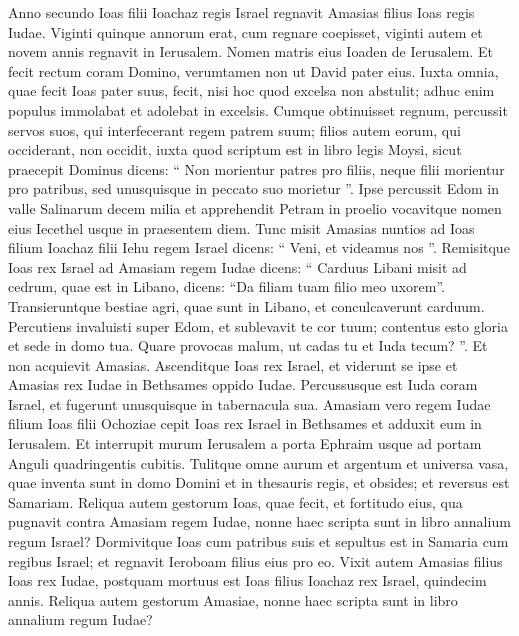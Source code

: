 \begin{biblechapter}
\begin{biblechapter}
\begin{biblechapter}
\begin{biblechapter}
\begin{biblechapter}
\begin{biblechapter}
\begin{biblechapter}
\begin{biblechapter}
\begin{biblechapter}
\begin{biblechapter}
\begin{biblechapter}
\begin{biblechapter}
\begin{biblechapter}
\begin{biblechapter}
 \verse Anno secundo Ioas filii Ioachaz regis Israel regnavit Amasias filius Ioas regis Iudae. 
\verse Viginti quinque annorum erat, cum regnare coepisset, viginti autem et novem annis regnavit in Ierusalem. Nomen matris eius Ioaden de Ierusalem. 
\verse Et fecit rectum coram Domino, verumtamen non ut David pater eius. Iuxta omnia, quae fecit Ioas pater suus, fecit, 
\verse nisi hoc quod excelsa non abstulit; adhuc enim populus immolabat et adolebat in excelsis. 
 \verse Cumque obtinuisset regnum, percussit servos suos, qui interfecerant regem patrem suum; 
\verse filios autem eorum, qui occiderant, non occidit, iuxta quod scriptum est in libro legis Moysi, sicut praecepit Dominus dicens: “ Non morientur patres pro filiis, neque filii morientur pro patribus, sed unusquisque in peccato suo morietur ”.
 \verse Ipse percussit Edom in valle Salinarum decem milia et apprehendit Petram in proelio vocavitque nomen eius Iecethel usque in praesentem diem.
 \verse Tunc misit Amasias nuntios ad Ioas filium Ioachaz filii Iehu regem Israel dicens: “ Veni, et videamus nos ”. 
\verse Remisitque Ioas rex Israel ad Amasiam regem Iudae dicens: “ Carduus Libani misit ad cedrum, quae est in Libano, dicens: “Da filiam tuam filio meo uxorem”. Transieruntque bestiae agri, quae sunt in Libano, et conculcaverunt carduum. 
\verse Percutiens invaluisti super Edom, et sublevavit te cor tuum; contentus esto gloria et sede in domo tua. Quare provocas malum, ut cadas tu et Iuda tecum? ”. 
\verse Et non acquievit Amasias.
 Ascenditque Ioas rex Israel, et viderunt se ipse et Amasias rex Iudae in Bethsames oppido Iudae. 
\verse Percussusque est Iuda coram Israel, et fugerunt unusquisque in tabernacula sua. 
\verse Amasiam vero regem Iudae filium Ioas filii Ochoziae cepit Ioas rex Israel in Bethsames et adduxit eum in Ierusalem. Et interrupit murum Ierusalem a porta Ephraim usque ad portam Anguli quadringentis cubitis. 
\verse Tulitque omne aurum et argentum et universa vasa, quae inventa sunt in domo Domini et in thesauris regis, et obsides; et reversus est Samariam.
 \verse Reliqua autem gestorum Ioas, quae fecit, et fortitudo eius, qua pugnavit contra Amasiam regem Iudae, nonne haec scripta sunt in libro annalium regum Israel? 
\verse Dormivitque Ioas cum patribus suis et sepultus est in Samaria cum regibus Israel; et regnavit Ieroboam filius eius pro eo.
 \verse Vixit autem Amasias filius Ioas rex Iudae, postquam mortuus est Ioas filius Ioachaz rex Israel, quindecim annis.
 \verse Reliqua autem gestorum Amasiae, nonne haec scripta sunt in libro annalium regum Iudae? 

\end{biblechapter}
\end{biblechapter}
\end{biblechapter}
\end{biblechapter}
\end{biblechapter}
\end{biblechapter}
\end{biblechapter}
\end{biblechapter}
\end{biblechapter}
\end{biblechapter}
\end{biblechapter}
\end{biblechapter}
\end{biblechapter}
\end{biblechapter}
